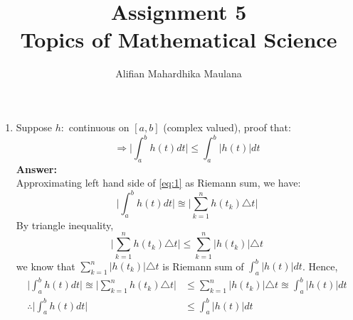 \documentclass[a4paper,12pt]{article}
\title{Assignment 5\\ Topics of Mathematical Science}
\author{Alifian Mahardhika Maulana}
\begin{document}
\maketitle
\begin{enumerate}
	\item Suppose $h:$ continuous on $[a,b]$ (complex valued), proof that:
	\begin{equation}\label{eq:1}
	\Rightarrow \Bigr|\int_{a}^{b}h(t) dt\Bigr| \leq \int_{a}^{b} |h(t)| dt
	\end{equation}
	\newline
	\textbf{Answer:}\\
	\newline
	Approximating left hand side of \eqref{eq:1} as Riemann sum, we have:
	\begin{equation}\label{eq:2}
	\Bigr|\int_{a}^{b}h(t) dt\Bigr| \approxeq \Bigr|\sum_{k=1}^{n} h(t_k) \triangle t\Bigr|
	\end{equation}
	By triangle inequality,
	\begin{equation}\label{eq:3}
	\Bigr|\sum_{k=1}^{n} h(t_k) \triangle t\Bigr| \leq \sum_{k=1}^{n} |h(t_k)| \triangle t
	\end{equation}
	we know that $\sum_{k=1}^{n} |h(t_k)| \triangle t$ is Riemann sum of $\int_{a}^{b} |h(t)| dt$.
	Hence,
	\begin{equation}\label{eq:4}
	\begin{aligned}
			\Bigr|\int_{a}^{b}h(t) dt\Bigr| \approxeq \Bigr|\sum_{k=1}^{n} h(t_k) \triangle t\Bigr| &\leq \sum_{k=1}^{n} |h(t_k)| \triangle t \approxeq \int_{a}^{b} |h(t)| dt\\
			\therefore \Bigr|\int_{a}^{b}h(t) dt\Bigr| &\leq \int_{a}^{b} |h(t)| dt
	\end{aligned}
	\end{equation}
\end{enumerate}
\end{document}
